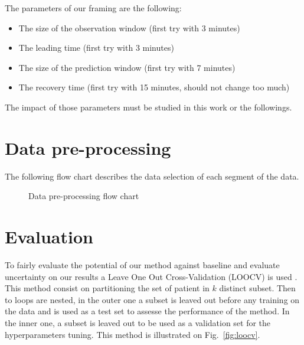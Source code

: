 \documentclass[a4paper,12pt]{article}
\begin{document}
The parameters of our framing are the following:
\begin{itemize}
    \item The size of the observation window (first try with 3 minutes)
    \item The leading time (first try with 3 minutes)
    \item The size of the prediction window (first try with 7 minutes)
    \item The recovery time (first try with 15 minutes, should not change too much)
\end{itemize}

The impact of those parameters must be studied in this work or the followings.

\section{Data pre-processing}

The following flow chart describes the data selection of each segment of the data. 

\begin{figure}[h]
    \centering
    
    \caption{Data pre-processing flow chart}
    \label{fig:preprocessing}
\end{figure}



\section{Evaluation}

To fairly evaluate the potential of our method against baseline and evaluate uncertainty on our results a Leave One Out Cross-Validation (LOOCV) is used \cite{meghnoudjSparseOptimalControlbased2024}. This method consist on partitioning the set of patient in $k$ distinct subset. Then to loops are nested, in the outer one a subset is leaved out before any training on the data and is used as a test set to assesse the performance of the method. In the inner one, a subset is leaved out to be used as a validation set for the hyperparameters tuning. This method is illustrated on Fig.~\ref{fig:loocv}.
\end{document}
